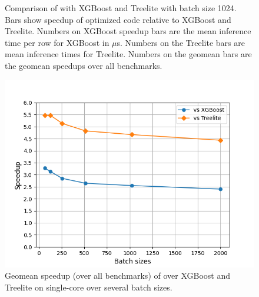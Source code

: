 \begin{figure}
  \centering
  \caption{Comparison of \Treebeard{} with XGBoost and Treelite with batch size 1024. Bars show speedup of 
           \Treebeard{} optimized code relative to XGBoost and Treelite. Numbers on XGBoost speedup bars are the 
           mean inference time per row for XGBoost in $\mu$s. Numbers on the Treelite bars are mean inference times 
           for Treelite. Numbers on the geomean bars are the geomean speedups over all benchmarks.}
  \label{fig:XGBoostCompare}
\end{figure}

\begin{figure}[tbp]
  \centering
  \includegraphics[width=0.8\linewidth]{figures/result/scalar_Intel_mean_speedups_treebeard_vs_xgboost_treelite.png}
  \caption{Geomean speedup (over all benchmarks) of \Treebeard{} over XGBoost
  and Treelite on single-core over several batch sizes.}
\label{Fig:XGBoostBatchSizeCompare} \end{figure}

